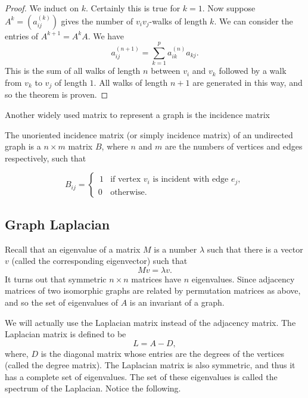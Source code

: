 \begin{proof}
We induct on \(k\).
Certainly this is true for \(k=1\).
Now suppose \(A^{k}=\left(a_{ij}^{\left(k\right)}\right)\) gives the number of \(v_{i}v_{j}\)-walks of length \(k\).
We can consider the entries of \(A^{k+1}=A^{k}A\).
We have
\[
a_{ij}^{\left(n+1\right)}=\sum_{k=1}^{p}a_{ik}^{\left(n\right)} a_{kj}.
\]
This is the sum of all walks of length \(n\) between \(v_{i}\) and \(v_{k}\) followed by a walk from \(v_{k}\) to \(v_{j}\) of length \(1\).
All walks of length \(n+1\) are generated in this way, and so the theorem is proven.
\end{proof}

Another widely used matrix to represent a graph is the incidence matrix

\begin{definition}
The unoriented incidence matrix (or simply incidence matrix) of an undirected graph is a $n\times  m $ matrix $B$, where $n$ and $m$ are the numbers of vertices and edges respectively, such that

$$ B_{ij}=\left\{{\begin{array}{rl}\,1&{\text{if vertex }}v_{i}{\text{ is incident with edge }}e_{j},\\0&{\text{otherwise.}}\end{array}}\right. $$
\end{definition}

\subsection{Graph Laplacian}

Recall that an eigenvalue of a matrix \(M\) is a number \(\lambda\) such that there is a vector \(v\) (called the corresponding eigenvector) such that
\[
Mv=\lambda v.
\]
It turns out that symmetric \(n\times n\) matrices have \(n\) eigenvalues.
Since adjacency matrices of two isomorphic graphs are related by permutation matrices as above, and so the set of eigenvalues of \(A\) is an invariant of a graph.

We will actually use the Laplacian matrix instead of the adjacency matrix.
The Laplacian matrix is defined to be
\[
L=A-D,
\]
where, \(D\) is the diagonal matrix whose entries are the degrees of the vertices (called the degree matrix).
The Laplacian matrix is also symmetric, and thus it has a complete set of eigenvalues.
The set of these eigenvalues is called the spectrum of the Laplacian.
Notice the following.


